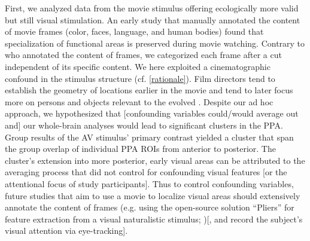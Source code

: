 \documentclass[english]{article}
\begin{document}
First, we analyzed data from the movie stimulus offering ecologically more valid
but still visual stimulation.
%
An early study \citep{bartels2004mapping} that manually annotated the content of
movie frames (color, faces, language, and human bodies) found that
specialization of functional areas is preserved during movie watching.
%
Contrary to \citep{bartels2004mapping} who annotated the content of frames, we
categorized each frame after a cut independent of its specific content.
We here exploited a cinematographic confound in the stimulus structure (cf.
\ref{rationale}).
Film directors tend to establish the geometry of locations earlier in the movie
and tend to later focus more on persons and objects relevant to the evolved
\citep{brown2012cinematography, mercado2011filmmakers}.
Despite our ad hoc approach, we hypothesized that [confounding variables
could/would average out and] our whole-brain analyses would lead to significant
clusters in the PPA.
Group results of the AV stimulus' primary contrast yielded a cluster that span
the group overlap of individual PPA ROIs from anterior to posterior.
The cluster's extension into more posterior, early visual areas can be
attributed to the averaging process that did not control for confounding visual
features [or the attentional focus of study participants].
%
Thus to control confounding variables, future studies that aim to use a movie to
localize visual areas should extensively annotate the content of frames (e.g.
using the open-source solution ``Pliers'' for feature extraction from a visual
naturalistic stimulus; \citep{mcnamara2017developing})[, and record the
subject's visual attention via eye-tracking].
%



\end{document}
